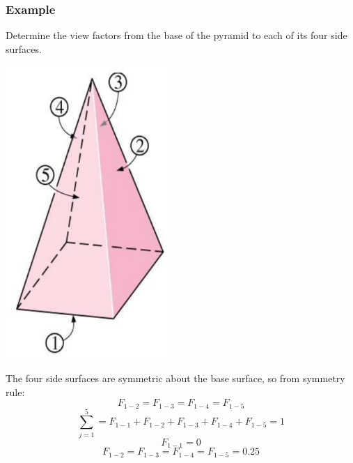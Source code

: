 \documentclass[11pt]{article}
\begin{document}
\subsubsection{Example}
\label{sec:org8ff4abf}
Determine the view factors from the base of the pyramid to each of its four side surfaces.
\begin{center}
\includegraphics[height=30em]{./images/symmetry-rule-example-diagram.png}
\end{center}

The four side surfaces are symmetric about the base surface, so from symmetry rule:
\[F_{1-2} = F_{1-3} = F_{1-4} = F_{1-5}\]
\[\sum_{j=1}^5 = F_{1-1} + F_{1-2} + F_{1-3} + F_{1-4} + F_{1-5} = 1\]
\[F_{1-1} = 0\]
\[F_{1-2} = F_{1-3} = F_{1-4} = F_{1-5} = 0.25\]
\end{document}
